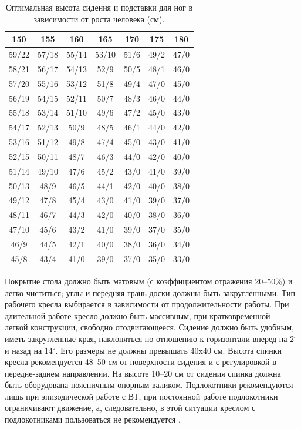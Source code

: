 \documentclass[12pt,a4paper]{report}
\begin{document}
\begin{table}[b]
\begin{center}
\begin{tabular}{|c|c|c|c|c|c|c|}
\hline
150	    &155	&160    &165	&170    &175    &180 \\
\hline
59/22	&57/18	&55/14  &53/10	&51/6	&49/2	&47/0\\
\hline
58/21	&56/17	&54/13	&52/9	&50/5	&48/1	&46/0\\
\hline
57/20	&55/16	&53/12	&51/8	&49/4	&47/0	&45/0\\
\hline
56/19	&54/15	&52/11	&50/7	&48/3	&46/0	&44/0\\
\hline
55/18	&53/14	&51/10	&49/6	&47/2	&45/0	&43/0\\
\hline
54/17	&52/13	&50/9	&48/5	&46/1	&44/0	&42/0\\
\hline
53/16	&51/12	&49/8	&47/4	&45/0	&43/0	&41/0\\
\hline
52/15	&50/11	&48/7	&46/3	&44/0	&42/0	&40/0\\
\hline
51/14	&49/10	&47/6	&45/2	&43/0	&41/0	&39/0\\
\hline
50/13	&48/9	&46/5	&44/1	&42/0	&40/0	&38/0\\
\hline
49/12	&47/8	&45/4	&43/0	&41/0	&39/0	&37/0\\
\hline
48/11	&46/7	&44/3	&42/0	&40/0	&38/0	&36/0\\
\hline
47/10	&45/6	&43/2	&41/0	&39/0	&37/0	&35/0\\
\hline
46/9    &44/5	&42/1	&40/0	&38/0	&36/0	&34/0\\
\hline
45/8	&43/4	&41/0	&39/0	&37/0	&35/0	&33/0\\
\hline
\end{tabular}
\end{center}
\caption{Оптимальная высота сидения и подставки для ног в зависимости от роста человека (см).}
\label{tb:bgd1}
\end{table}

Покрытие стола должно быть матовым (с коэффициентом отражения 20–50\%) и легко чиститься; углы и передняя грань доски должны быть закругленными. Тип рабочего кресла выбирается в зависимости от продолжительности работы. При длительной работе кресло должно быть массивным, при кратковременной — легкой конструкции, свободно отодвигающееся. Сидение должно быть удобным, иметь закругленные края, наклоняться по отношению к горизонтали вперед на 2$^\circ$ и назад на 14$^\circ$. Его размеры не должны превышать 40x40 см.  Высота спинки кресла рекомендуется 48–50 см от поверхности сидения и с регулировкой в передне-заднем направлении. На высоте 10–20 см от сидения спинка должна быть оборудована поясничным опорным валиком. Подлокотники рекомендуются лишь при эпизодической работе с ВТ, при постоянной работе подлокотники ограничивают движение, а, следовательно, в этой ситуации креслом с подлокотниками пользоваться не рекомендуется \cite{bgd18}.
\end{document}

